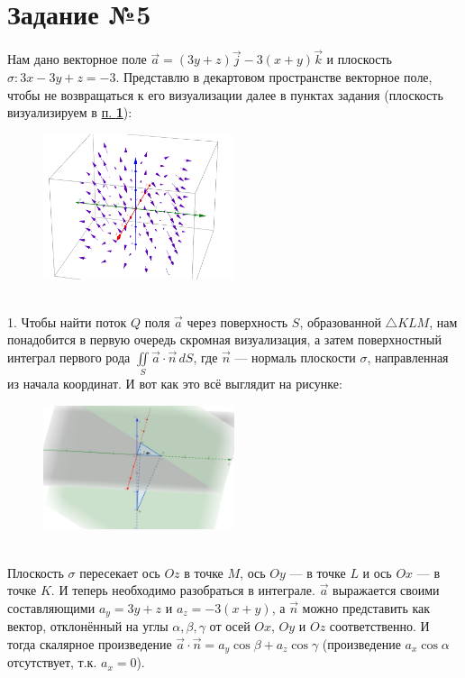 \documentclass[a3paper,14pt]{extarticle}
\begin{document}
\section*{\centering Задание №5}
Нам дано векторное поле $\vec{a} = (3y+z)\vec{j}-3(x+y)\vec{k}$ и плоскость $\sigma\colon 3x-3y+z=-3$. Представлю в декартовом пространстве векторное поле, чтобы не возвращаться к его визуализации далее в пунктах задания (плоскость визуализируем в \hyperlink{fromabove}{п. \textbf{1}}):
\begin{figure}[h]
    \centering\includegraphics[width=0.5\textwidth]{5.0.png}
\end{figure} \,\\[1em]
\hypertarget{fromabove}{1.} Чтобы найти поток $Q$ поля $\vec{a}$ через поверхность $S$, образованной $\triangle KLM$, нам понадобится в первую очередь скромная визуализация, а затем поверхностный интеграл первого рода $\iint\limits_S\vec{a}\cdot\vec{n}\,dS$, где $\vec{n}$ --- нормаль плоскости $\sigma$, направленная из начала координат. И вот как это всё выглядит на рисунке:
\begin{figure}[h]
    \centering\includegraphics[width=0.5\textwidth]{5.1.png}
\end{figure} \,\\[1em]
Плоскость $\sigma$ пересекает ось $Oz$ в точке $M$, ось $Oy$ --- в точке $L$ и ось $Ox$ --- в точке $K$. И теперь необходимо разобраться в интеграле. $\vec{a}$ выражается своими составляющими $a_y = 3y + z$ и $a_z = -3(x+y)$, а $\vec{n}$ можно представить как вектор, отклонённый на углы $\alpha, \beta, \gamma$ от осей $Ox$, $Oy$ и $Oz$ соответственно. И тогда скалярное произведение $\vec{a}\cdot\vec{n} = a_y\cos{\beta} + a_z\cos{\gamma}$ (произведение $a_x\cos{\alpha}$ отсутствует, т.к. $a_x = 0$). \\[1em]
\end{document}
